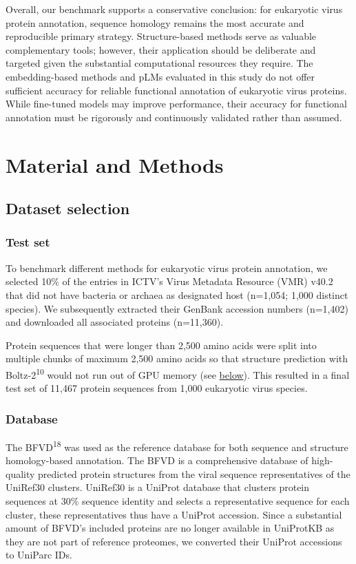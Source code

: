 \documentclass[
  sn-nature,
]{sn-jnl}
\begin{document}
Overall, our benchmark supports a conservative conclusion: for
eukaryotic virus protein annotation, sequence homology remains the most
accurate and reproducible primary strategy. Structure-based methods
serve as valuable complementary tools; however, their application should
be deliberate and targeted given the substantial computational resources
they require. The embedding-based methods and pLMs evaluated in this
study do not offer sufficient accuracy for reliable functional
annotation of eukaryotic virus proteins. While fine-tuned models may
improve performance, their accuracy for functional annotation must be
rigorously and continuously validated rather than assumed.

\section{Material and Methods}\label{material-and-methods}

\subsection{Dataset selection}\label{dataset-selection}

\subsubsection{Test set}\label{test-set}

To benchmark different methods for eukaryotic virus protein annotation,
we selected 10\% of the entries in ICTV's Virus Metadata Resource (VMR)
v40.2 that did not have bacteria or archaea as designated host (n=1,054;
1,000 distinct species). We subsequently extracted their GenBank
accession numbers (n=1,402) and downloaded all associated proteins
(n=11,360).

Protein sequences that were longer than 2,500 amino acids were split
into multiple chunks of maximum 2,500 amino acids so that structure
prediction with Boltz-2\textsuperscript{10} would not run out of GPU
memory (see \hyperref[computational-benchmarking]{below}). This resulted
in a final test set of 11,467 protein sequences from 1,000 eukaryotic
virus species.

\subsubsection{Database}\label{database}

The BFVD\textsuperscript{18} was used as the reference database for both
sequence and structure homology-based annotation. The BFVD is a
comprehensive database of high-quality predicted protein structures from
the viral sequence representatives of the UniRef30 clusters. UniRef30 is
a UniProt database that clusters protein sequences at 30\% sequence
identity and selects a representative sequence for each cluster, these
representatives thus have a UniProt accession. Since a substantial
amount of BFVD's included proteins are no longer available in UniProtKB
as they are not part of reference proteomes, we converted their UniProt
accessions to UniParc IDs.
\end{document}
